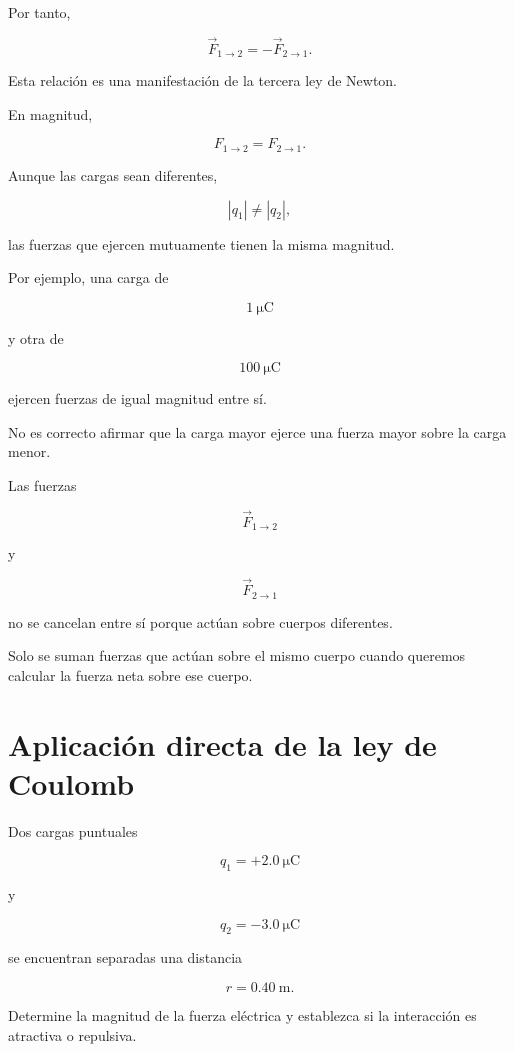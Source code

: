 Por tanto,

\begin{equation}
    \boxed{
    \vec{F}_{1\to2}
    =
    -\vec{F}_{2\to1}
    }.
    \label{eq:tercera_ley_coulomb}
\end{equation}

Esta relación es una manifestación de la tercera ley de Newton.

En magnitud,

\[
\boxed{
F_{1\to2}
=
F_{2\to1}
}.
\]

\begin{idea}

Aunque las cargas sean diferentes,

\[
|q_1|\neq|q_2|,
\]

las fuerzas que ejercen mutuamente tienen la misma magnitud.

Por ejemplo, una carga de

\[
\SI{1}{\micro\coulomb}
\]

y otra de

\[
\SI{100}{\micro\coulomb}
\]

ejercen fuerzas de igual magnitud entre sí.

No es correcto afirmar que la carga mayor ejerce una fuerza mayor sobre la
carga menor.

\end{idea}

\begin{errorfrecuente}

Las fuerzas

\[
\vec{F}_{1\to2}
\]

y

\[
\vec{F}_{2\to1}
\]

no se cancelan entre sí porque actúan sobre cuerpos diferentes.

Solo se suman fuerzas que actúan sobre el mismo cuerpo cuando queremos
calcular la fuerza neta sobre ese cuerpo.

\end{errorfrecuente}



\section{Aplicación directa de la ley de Coulomb}

\begin{ejemplo}

Dos cargas puntuales

\[
q_1=+\SI{2.0}{\micro\coulomb}
\]

y

\[
q_2=-\SI{3.0}{\micro\coulomb}
\]

se encuentran separadas una distancia

\[
r=\SI{0.40}{\metre}.
\]

Determine la magnitud de la fuerza eléctrica y establezca si la interacción
es atractiva o repulsiva.

\end{ejemplo}

